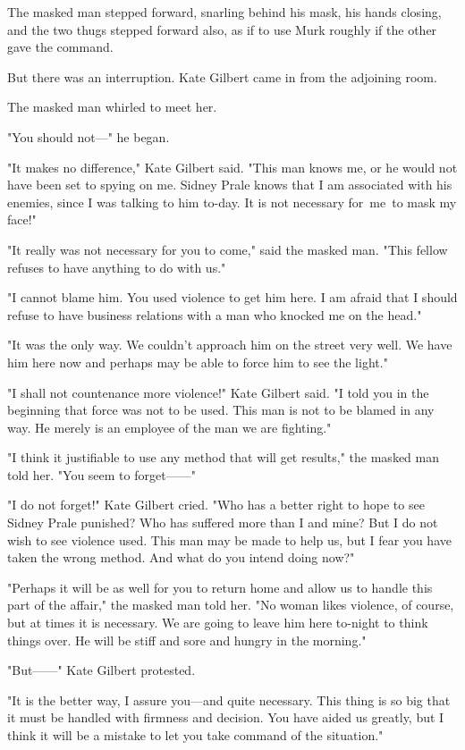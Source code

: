 \documentclass{novel}
\begin{document}
The masked man stepped forward, snarling behind his mask, his hands closing, and the two thugs stepped forward also, as if to use Murk roughly if the other gave the command.

But there was an interruption. Kate Gilbert came in from the adjoining room.

The masked man whirled to meet her.

"You should not---" he began.

"It makes no difference," Kate Gilbert said. "This man knows me, or he would not have been set to spying on me. Sidney Prale knows that I am associated with his enemies, since I was talking to him to-day. It is not necessary for me to mask my face!"

"It really was not necessary for you to come," said the masked man. "This fellow refuses to have anything to do with us."

"I cannot blame him. You used violence to get him here. I am afraid that I should refuse to have business relations with a man who knocked me on the head."

"It was the only way. We couldn't approach him on the street very well. We have him here now and perhaps may be able to force him to see the light."

"I shall not countenance more violence!" Kate Gilbert said. "I told you in the beginning that force was not to be used. This man is not to be blamed in any way. He merely is an employee of the man we are fighting."

"I think it justifiable to use any method that will get results," the masked man told her. "You seem to forget------"

"I do not forget!" Kate Gilbert cried. "Who has a better right to hope to see Sidney Prale punished? Who has suffered more than I and mine? But I do not wish to see violence used. This man may be made to help us, but I fear you have taken the wrong method. And what do you intend doing now?"

"Perhaps it will be as well for you to return home and allow us to handle this part of the affair," the masked man told her. "No woman likes violence, of course, but at times it is necessary. We are going to leave him here to-night to think things over. He will be stiff and sore and hungry in the morning."

"But------" Kate Gilbert protested.

"It is the better way, I assure you---and quite necessary. This thing is so big that it must be handled with firmness and decision. You have aided us greatly, but I think it will be a mistake to let you take command of the situation."
\end{document}
